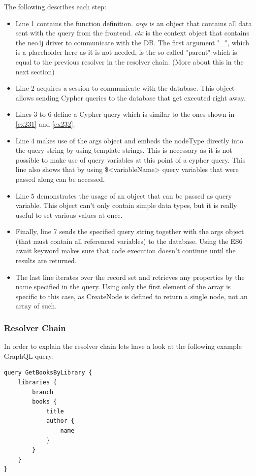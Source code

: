 The following describes each step:
\begin{itemize}
\item Line 1 contains the function definition. \emph{args} is an object that contains all data sent with the query from the frontend. \emph{ctx} is the context object that contains the neo4j driver to communicate with the DB. The first argument "\_", which is a placeholder here as it is not needed, is the so called "parent" which is equal to the previous resolver in the resolver chain. (More about this in the next section)
\item Line 2 acquires a session to communicate with the database. \cite{Neo4jDriver} This object allows sending Cypher queries to the database that get executed right away.
\item Lines 3 to 6 define a Cypher query which is similar to the ones shown in \autoref{ex231} and \autoref{ex232}. 
\item Line 4 makes use of the args object and embeds the nodeType directly into the query string by using template strings. This is necessary as it is not possible to make use of query variables at this point of a cypher query. This line also shows that by using \$<variableName> query variables that were passed along can be accessed.
\item Line 5 demonstrates the usage of an object that can be passed as query variable. This object can't only contain simple data types, but it is really useful to set various values at once.
\item Finally, line 7 sends the specified query string together with the args object (that must contain all referenced variables) to the database. Using the ES6 await keyword makes sure that code execution doesn't continue until the results are returned.
\item The last line iterates over the record set and retrieves any properties by the name specified in the query. Using only the first element of the array is specific to this case, as CreateNode is defined to return a single node, not an array of such.
\end{itemize}

\subsubsection{Resolver Chain}
In order to explain the resolver chain lets have a look at the following example GraphQL query: \citep[with adaptions]{ApolloResChain}
\lstset{language=GraphQL}
\begin{lstlisting}[label={ex242},caption={GraphQL query to fetch all books with their title and author name of all libraries}]
query GetBooksByLibrary {
	libraries { 
		branch 
		books { 
			title 
			author { 
				name 
			} 
		} 
	} 
}
\end{lstlisting}

